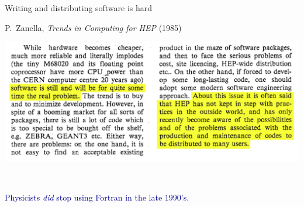 \documentclass[aspectratio=169]{beamer}
\begin{document}
\begin{frame}{Writing and distributing software is hard}
\vspace{0.25 cm}
\begin{center}
\begin{minipage}{0.8\linewidth}
\begin{center}
P.\ Zanella, {\it Trends in Computing for HEP} (1985)
\end{center}
\end{minipage}

\vspace{0.25 cm}
\includegraphics[width=0.9\linewidth]{PLOTS/zanella-trends-in-computing-for-hep.png}
\end{center}
\end{frame}

\begin{frame}{\mbox{ }}
\vspace{0.5 cm}
\Large
\begin{center}
\begin{minipage}{0.8\linewidth}
\textcolor{darkblue}{Physicists {\it did} stop using Fortran in the late 1990's.}

\vspace{0.5 cm}

\vspace{0.5 cm}
\end{minipage}
\end{center}
\end{frame}
\end{document}

